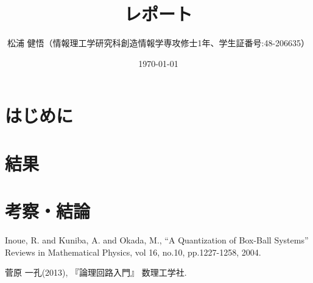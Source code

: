 \documentclass{jsreport}
\begin{document}
\title{レポート}
\author{松浦 健悟（情報理工学研究科創造情報学専攻修士1年、学生証番号:48-206635）}
\date{\today}
\maketitle

\section{はじめに}

\section{}
\section{}

\section{結果}


\section{考察・結論}

\begin{thebibliography}{}
  \bibitem{} Inoue, R. and Kuniba, A. and Okada, M.,
    ``A Quantization of Box-Ball Systems'' Reviews in Mathematical Physics,
    vol 16, no.10, pp.1227-1258, 2004.

  \bibitem{} 菅原 一孔(2013),
   『論理回路入門』 数理工学社.

\end{thebibliography}
\end{document}
